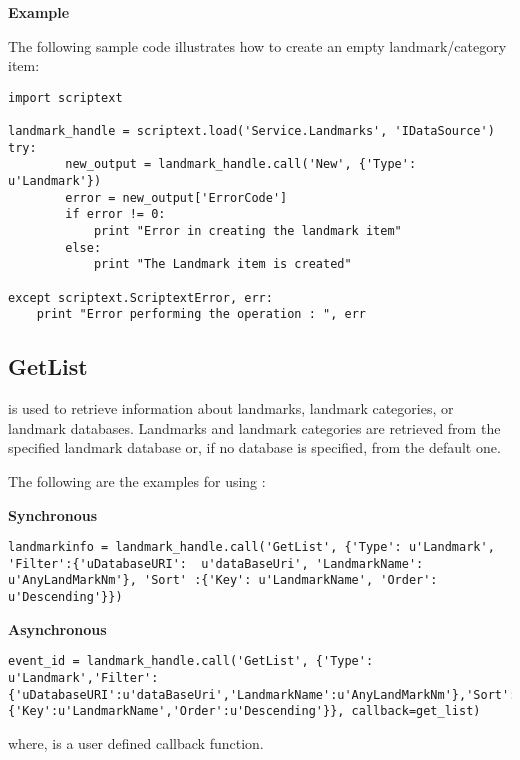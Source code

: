 {\bf Example} \break

The following sample code illustrates how to create an empty landmark/category item:

\begin{verbatim}
import scriptext

landmark_handle = scriptext.load('Service.Landmarks', 'IDataSource')
try:
		new_output = landmark_handle.call('New', {'Type': u'Landmark'})
		error = new_output['ErrorCode']
		if error != 0:
			print "Error in creating the landmark item"
		else:
			print "The Landmark item is created"

except scriptext.ScriptextError, err:
    print "Error performing the operation : ", err
\end{verbatim}

\subsection{GetList}
\label{subsec:landmarkgetlist}

 is used to retrieve information about landmarks, landmark categories, or landmark databases. Landmarks and landmark categories are retrieved from the specified landmark database or, if no database is specified, from the default one.

The following are the examples for using :

{\bf Synchronous} \break

\begin{verbatim}
landmarkinfo = landmark_handle.call('GetList', {'Type': u'Landmark', 'Filter':{'uDatabaseURI':  u'dataBaseUri', 'LandmarkName': u'AnyLandMarkNm'}, 'Sort' :{'Key': u'LandmarkName', 'Order': u'Descending'}})
\end{verbatim}

{\bf Asynchronous} \break

\begin{verbatim}
event_id = landmark_handle.call('GetList', {'Type': u'Landmark','Filter':{'uDatabaseURI':u'dataBaseUri','LandmarkName':u'AnyLandMarkNm'},'Sort':{'Key':u'LandmarkName','Order':u'Descending'}}, callback=get_list)
\end{verbatim}

where,  is a user defined callback function. 

